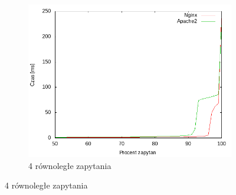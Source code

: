 \begin{figure}
\begin{subfigure}[h]{0.3\textwidth}
		\includegraphics[width=\textwidth]{testy/wybor_index_maly_4.png}
		\caption{4 równoległe zapytania}
	\end{subfigure}


\end{figure}
